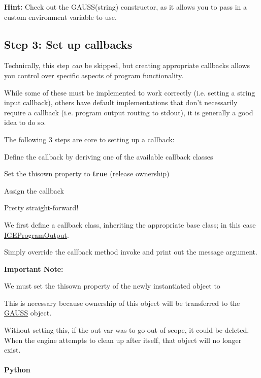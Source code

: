 {\bfseries Hint\-:} Check out the {\ttfamily G\-A\-U\-S\-S(string)} constructor, as it allows you to pass in a custom environment variable to use.\hypertarget{index_hw_step3}{}\subsection{Step 3\-: Set up callbacks}\label{index_hw_step3}
Technically, this step {\itshape can} be skipped, but creating appropriate callbacks allows you control over specific aspects of program functionality.

While some of these must be implemented to work correctly (i.\-e. setting a string input callback), others have default implementations that don't necessarily require a callback (i.\-e. program output routing to {\ttfamily stdout}), it is generally a good idea to do so.

The following 3 steps are core to setting up a callback\-:
\begin{DoxyEnumerate}
\item Define the callback by deriving one of the available callback classes
\item Set the {\ttfamily thisown} property to {\bfseries true} (release ownership)
\item Assign the callback
\end{DoxyEnumerate}

Pretty straight-\/forward!

We first define a callback class, inheriting the appropriate base class; in this case \hyperlink{class_i_g_e_program_output}{I\-G\-E\-Program\-Output}.

Simply override the callback method {\ttfamily invoke} and print out the {\ttfamily message} argument.

{\bfseries Important Note\-:}

We must set the {\ttfamily thisown} property of the newly instantiated object to {}

This is necessary because ownership of this object will be transferred to the \hyperlink{class_g_a_u_s_s}{G\-A\-U\-S\-S} object.

Without setting this, if the {\ttfamily out} var was to go out of scope, it could be deleted. When the engine attempts to clean up after itself, that object will no longer exist.

\paragraph*{Python}


